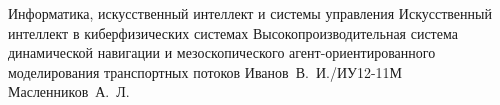 \documentclass{bmstu-iu1}  %
\begin{document}

\makeresearchtitle
    {Информатика, искусственный интеллект и системы управления} %
    {Искусственный интеллект в киберфизических системах} %
    {Высокопроизводительная система динамической навигации и мезоскопического агент-ориентированного моделирования транспортных потоков} %
    {Иванов~В.~И./ИУ12-11М} %
    {Масленников~А.~Л.} %
    {} %


\maketableofcontents









\makebibliography
\end{document}
